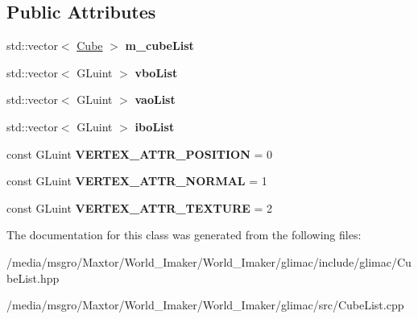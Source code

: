 \subsection*{Public Attributes}
\begin{DoxyCompactItemize}
\item 
\mbox{\label{classglimac_1_1CubeList_a571bd6927341c00bba36750788a6eda8}} 
std\+::vector$<$ \hyperlink{classglimac_1_1Cube}{Cube} $>$ {\bfseries m\+\_\+cube\+List}
\item 
\mbox{\label{classglimac_1_1CubeList_abd897d76c4194e98e406ecd276bfa67c}} 
std\+::vector$<$ G\+Luint $>$ {\bfseries vbo\+List}
\item 
\mbox{\label{classglimac_1_1CubeList_a3275ec3106283c5661d78bd5c547b5f0}} 
std\+::vector$<$ G\+Luint $>$ {\bfseries vao\+List}
\item 
\mbox{\label{classglimac_1_1CubeList_a1957da945ddd55800df7d190257db456}} 
std\+::vector$<$ G\+Luint $>$ {\bfseries ibo\+List}
\item 
\mbox{\label{classglimac_1_1CubeList_afd0c91ad6e9b8ec2d2e764d8594fd6df}} 
const G\+Luint {\bfseries V\+E\+R\+T\+E\+X\+\_\+\+A\+T\+T\+R\+\_\+\+P\+O\+S\+I\+T\+I\+ON} = 0
\item 
\mbox{\label{classglimac_1_1CubeList_a6e8ace9eaedb3df93cbb3f96ea6ad993}} 
const G\+Luint {\bfseries V\+E\+R\+T\+E\+X\+\_\+\+A\+T\+T\+R\+\_\+\+N\+O\+R\+M\+AL} = 1
\item 
\mbox{\label{classglimac_1_1CubeList_a0532ab3a5ceaa052c6f859a1e08ede62}} 
const G\+Luint {\bfseries V\+E\+R\+T\+E\+X\+\_\+\+A\+T\+T\+R\+\_\+\+T\+E\+X\+T\+U\+RE} = 2
\end{DoxyCompactItemize}


The documentation for this class was generated from the following files\+:\begin{DoxyCompactItemize}
\item 
/media/msgro/\+Maxtor/\+World\+\_\+\+Imaker/\+World\+\_\+\+Imaker/glimac/include/glimac/Cube\+List.\+hpp\item 
/media/msgro/\+Maxtor/\+World\+\_\+\+Imaker/\+World\+\_\+\+Imaker/glimac/src/Cube\+List.\+cpp\end{DoxyCompactItemize}

